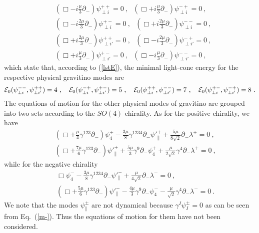 \documentclass[a4paper,12pt]{article}
\numberwithin{equation}{section}
\begin{document}
\begin{eqnarray}
& & ( \Box - i \frac{\mu}{3} \partial_- )
               \psi^{++}_{\perp i} = 0~,~~~
    ( \Box + i \frac{\mu}{3} \partial_- )
               \psi^{-+}_{\perp i} = 0~,~~~
 \nonumber \\
& & ( \Box - i \frac{2 \mu}{3} \partial_-)
               \psi^{+-}_{\perp i} = 0 ~,~~~
    ( \Box + i \frac{2 \mu}{3} \partial_-)
               \psi^{--}_{\perp i} = 0 ~,
 \nonumber \\
& & ( \Box + i \frac{2 \mu}{3} \partial_- )
               \psi^{++}_{\perp i'} = 0~,~~~
    ( \Box - i \frac{2 \mu}{3} \partial_- )
               \psi^{-+}_{\perp i'} = 0~,~~~
 \nonumber \\
& & ( \Box + i \frac{\mu}{3} \partial_-)
              \psi^{+-}_{\perp i'} = 0 ~,~~~
    ( \Box - i \frac{\mu}{3} \partial_-)
              \psi^{--}_{\perp i'} = 0 ~,
\end{eqnarray}
which state that, according to (\ref{lstE}), the minimal light-cone
energy for the respective physical gravitino modes are
\begin{equation}
{\cal E}_0 ( \psi^{--}_{\perp i}, \psi^{++}_{\perp i'} ) = 4 ~,~~~
{\cal E}_0 ( \psi^{-+}_{\perp i}, \psi^{+-}_{\perp i'} ) = 5 ~,~~~
{\cal E}_0 ( \psi^{++}_{\perp i}, \psi^{--}_{\perp i'} ) = 7 ~,~~~
{\cal E}_0 ( \psi^{+-}_{\perp i}, \psi^{-+}_{\perp i'} ) = 8 ~.
\end{equation}
The equations of motion for the other physical modes of gravitino are
grouped into two sets according to the $SO(4)$ chirality.  As for the
positive chirality, we have
\begin{eqnarray}
 & &  ( \Box + \frac{\mu}{4} \gamma^{123} \partial_-  ) \psi_4^+
 - \frac{3 \mu}{8} \gamma^{1234} \partial_- \psi'^+_\|
 + \frac{5\mu}{8 \sqrt{2}} \partial_- \lambda^+ = 0 ~,
  \nonumber \\
 & &  ( \Box + \frac{7 \mu}{6} \gamma^{123} \partial_- ) \psi'^+_\|
 + \frac{5 \mu}{3} \gamma^9 \partial_- \psi_4^+
 + \frac{\mu}{2\sqrt{2}} \gamma^4 \partial_- \lambda^+ = 0 ~,
\label{sg+}
\end{eqnarray}
while for the negative chirality
\begin{eqnarray}
 & & \Box \psi_4^-
 - \frac{3 \mu}{8} \gamma^{1234} \partial_- \psi'^-_\|
 + \frac{\mu}{4 \sqrt{2}} \partial_- \lambda^- = 0 ~,
  \nonumber \\
 & & ( \Box + \frac{5 \mu}{6} \gamma^{123} \partial_- ) \psi'^-_\|
 - \frac{4 \mu}{3} \gamma^9 \partial_- \psi_4^-
 - \frac{\mu}{\sqrt{2}} \gamma^4 \partial_- \lambda^- = 0 ~.
\label{sg-}
\end{eqnarray}
We note that the modes $\psi^\pm_\|$ are not dynamical because
$\gamma^I \psi_I^\pm = 0$ as can be seen from Eq.~(\ref{m-}).  Thus
the equations of motion for them have not been considered.
\end{document}
